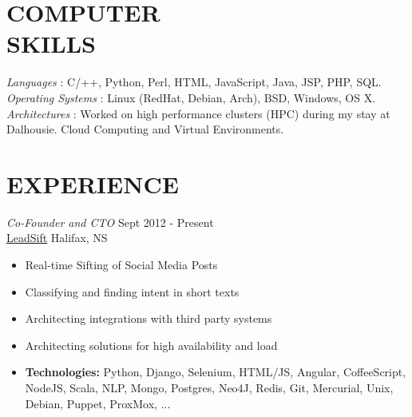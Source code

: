 \documentclass[line,margin]{res}
\begin{document}
\begin{resume}
\section{COMPUTER \\ SKILLS}
    {\sl Languages \hspace{35pt}}:
     C/++, Python, Perl, HTML, JavaScript, Java, JSP, PHP, SQL.\\
    {\sl Operating Systems }:
     Linux (RedHat, Debian, Arch), BSD, Windows, OS X. \\
    {\sl Architectures \hspace{27pt}}:
     Worked on high performance clusters (HPC) during my stay at \\
     \hspace*{92pt} Dalhousie. Cloud Computing and Virtual Environments.

\section{EXPERIENCE}

    {\sl Co-Founder and CTO} \hfill Sept 2012 - Present \\
    \href{http://www.leadsift.com}{LeadSift} \hfill Halifax, NS \smallskip
    \begin{itemize}  \itemsep -2pt %
     \item Real-time Sifting of Social Media Posts
     \item Classifying and finding intent in short texts
     \item Architecting integrations with third party systems
     \item Architecting solutions for high availability and load
     \item {\bf Technologies:} \hspace{1pt}
        Python, Django, Selenium, HTML/JS, Angular, CoffeeScript, \newline
        \hspace*{72pt} NodeJS, Scala, NLP, Mongo, Postgres, Neo4J, Redis, \newline
        \hspace*{72pt} Git, Mercurial, Unix, Debian, Puppet, ProxMox, ...
    \end{itemize}


\end{resume}
\end{document}
